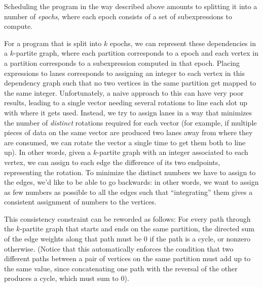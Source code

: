 Scheduling the program in the way described above amounts to splitting it into a number of {\em epochs}, where each epoch consists of a set of subexpressions to compute. 

For a program that is split into $k$ epochs, we can represent these dependencies  in a $k$-partite graph, where each partition corresponds to a epoch and each vertex in a partition corresponds to a subexpression computed in that epoch.
Placing expressions to lanes corresponds to assigning an integer to each vertex in this dependency graph such that no two vertices in the same partition get mapped to the same integer.
Unfortunately, a naive approach to this can have very poor results, leading to a single vector needing several rotations to line each slot up with where it gets used.
Instead, we try to assign lanes in a way that minimizes the number of {\em distinct} rotations required for each vector (for example, if multiple pieces of data on the same vector are produced two lanes away from where they are consumed, we can rotate the vector a single time to get them both to line up).
In other words, given a $k$-partite graph with an integer associated to each vertex, we can assign to each edge the difference of its two endpoints, representing the rotation. 
To minimize the distinct numbers we have to assign to the edges, we'd like to be able to go backwards: in other words, we want to assign as few numbers as possible to all the edges such that ``integrating'' them gives a consistent assignment of numbers to the vertices.

This consistency constraint can be reworded as follows: For every path through the $k$-partite graph that starts and ends on the same partition, the directed sum of the edge weights along that path must be 0 if the path is a cycle, or nonzero otherwise.
(Notice that this automatically enforces the condition that two different paths between a pair of vertices on the same partition must add up to the same value, since concatenating one path with the reversal of the other produces a cycle, which must sum to 0).


